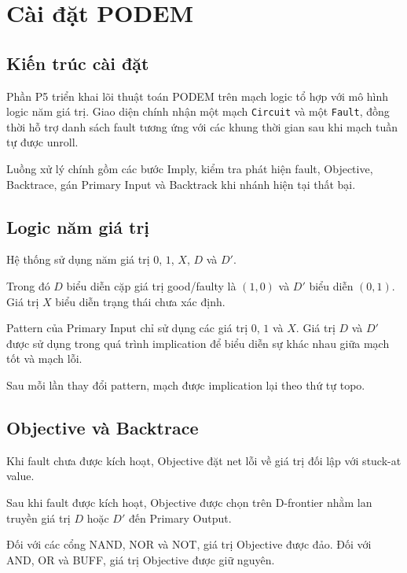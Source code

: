 \chapter{Cài đặt PODEM}

\label{sec:p5-cai-dat-podem}

\section{Kiến trúc cài đặt}

Phần P5 triển khai lõi thuật toán PODEM trên mạch logic tổ hợp với mô hình
logic năm giá trị. Giao diện chính nhận một mạch \texttt{Circuit} và một
\texttt{Fault}, đồng thời hỗ trợ danh sách fault tương ứng với các khung
thời gian sau khi mạch tuần tự được unroll.

Luồng xử lý chính gồm các bước Imply, kiểm tra phát hiện fault, Objective,
Backtrace, gán Primary Input và Backtrack khi nhánh hiện tại thất bại.

\section{Logic năm giá trị}

Hệ thống sử dụng năm giá trị $0$, $1$, $X$, $D$ và $D'$.

Trong đó $D$ biểu diễn cặp giá trị good/faulty là $(1,0)$ và $D'$ biểu diễn
$(0,1)$. Giá trị $X$ biểu diễn trạng thái chưa xác định.

Pattern của Primary Input chỉ sử dụng các giá trị $0$, $1$ và $X$.
Giá trị $D$ và $D'$ được sử dụng trong quá trình implication để biểu diễn
sự khác nhau giữa mạch tốt và mạch lỗi.

Sau mỗi lần thay đổi pattern, mạch được implication lại theo thứ tự topo.

\section{Objective và Backtrace}

Khi fault chưa được kích hoạt, Objective đặt net lỗi về giá trị đối lập với
stuck-at value.

Sau khi fault được kích hoạt, Objective được chọn trên D-frontier nhằm lan
truyền giá trị $D$ hoặc $D'$ đến Primary Output.

Đối với các cổng NAND, NOR và NOT, giá trị Objective được đảo.
Đối với AND, OR và BUFF, giá trị Objective được giữ nguyên.

